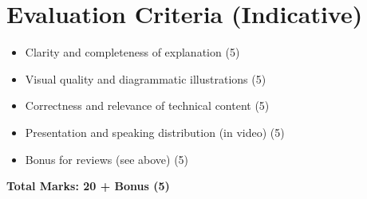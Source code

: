 \documentclass[10pt,answers]{exam}
\begin{document}
\section*{Evaluation Criteria (Indicative)}
\begin{itemize}[leftmargin=0.6cm]
    \footnotesize
  \item Clarity and completeness of explanation \hfill (5)
  \item Visual quality and diagrammatic illustrations \hfill (5)
  \item Correctness and relevance of technical content \hfill (5)
  \item Presentation and speaking distribution (in video) \hfill (5)
  \item Bonus for reviews (see above) \hfill (5)
\end{itemize}

\vspace{0.2cm}
\noindent\textbf{Total Marks: 20 + Bonus (5)}
\end{document}
